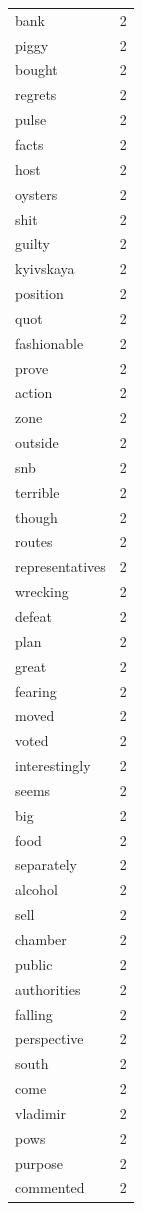 \begin{tabular}{lr}
bank & 2 \\
piggy & 2 \\
bought & 2 \\
regrets & 2 \\
pulse & 2 \\
facts & 2 \\
host & 2 \\
oysters & 2 \\
shit & 2 \\
guilty & 2 \\
kyivskaya & 2 \\
position & 2 \\
quot & 2 \\
fashionable & 2 \\
prove & 2 \\
action & 2 \\
zone & 2 \\
outside & 2 \\
snb & 2 \\
terrible & 2 \\
though & 2 \\
routes & 2 \\
representatives & 2 \\
wrecking & 2 \\
defeat & 2 \\
plan & 2 \\
great & 2 \\
fearing & 2 \\
moved & 2 \\
voted & 2 \\
interestingly & 2 \\
seems & 2 \\
big & 2 \\
food & 2 \\
separately & 2 \\
alcohol & 2 \\
sell & 2 \\
chamber & 2 \\
public & 2 \\
authorities & 2 \\
falling & 2 \\
perspective & 2 \\
south & 2 \\
come & 2 \\
vladimir & 2 \\
pows & 2 \\
purpose & 2 \\
commented & 2 \\

\end{tabular}
